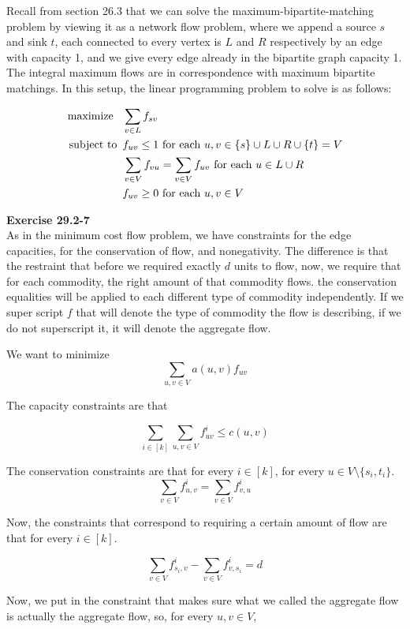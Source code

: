 \documentclass{article}
\begin{document}
Recall from section 26.3 that we can solve the maximum-bipartite-matching problem by viewing it as a network flow problem, where we append a source $s$ and sink $t$, each connected to every vertex is $L$ and $R$ respectively by an edge with capacity 1, and we give every edge already in the bipartite graph capacity 1.  The integral maximum flows are in correspondence with maximum bipartite matchings. In this setup, the linear programming problem to solve is as follows:

\begin{align*}
\mbox{maximize \,\,\,} & \sum_{v \in L} f_{sv}\\
\mbox{subject to \,} & f_{uv} \leq 1 \mbox{ for each } u,v \in \{s\} \cup L \cup R \cup \{t\} = V \\
& \sum_{v \in V} f_{vu} = \sum_{v \in V} f_{uv} \mbox{ for each } u \in L \cup R \\
& f_{uv} \geq 0 \mbox{ for each } u,v \in V \\
\end{align*}

\noindent\textbf{Exercise 29.2-7}\\

As in the minimum cost flow problem, we have constraints for the edge capacities, for the conservation of flow, and nonegativity. The difference is that the restraint that before we required exactly $d$ units to flow, now, we require that for each commodity, the right amount of that commodity flows. the conservation equalities will be applied to each different type of commodity independently. If we super script $f$ that will denote the type of commodity the flow is describing, if we do not superscript it, it will denote the aggregate flow.

We want to minimize
\[
\sum_{u,v\in V}a(u,v) f_{uv}
\]

The capacity constraints are that

\[
\sum_{i\in [k]} \sum_{u,v \in V} f_{uv}^i \le c(u,v)
\]

The conservation constraints are that for every $i\in [k]$, for every $u\in V\setminus\{s_i,t_i\}$.
\[
\sum_{v\in V} f_{u,v}^i = \sum_{v\in V} f_{v,u}^i
\]

Now, the constraints that correspond to requiring a certain amount of flow are that for every $i\in [k]$.

\[
\sum_{v\in V} f_{s_i,v}^i -\sum_{v\in V} f_{v,s_i}^i = d
\]

Now, we put in the constraint that makes sure what we called the aggregate flow is actually the aggregate flow, so, for every $u,v\in V$,
\end{document}

